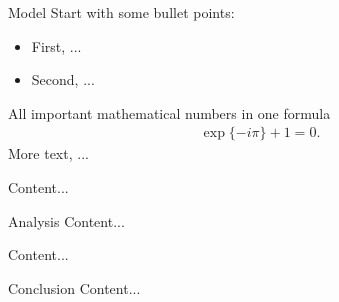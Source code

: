\begin{frame}{Model}
	Start with some bullet points:
	\begin{itemize}
		\item First, ...
		\item Second, ...
	\end{itemize}
	All important mathematical numbers in one formula
	\begin{eqnarray*}
		\exp\{-i\pi\} + 1 = 0.
	\end{eqnarray*}
	More text, ...
	\begin{definition}
		Content...
	\end{definition}
\end{frame}

\begin{frame}{Analysis}
	Content...
	\begin{theorem}
		Content...
	\end{theorem}
\end{frame}

\begin{frame}{Conclusion}
	Content...
\end{frame}
